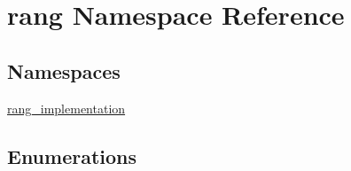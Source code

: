 \hypertarget{namespacerang}{}\section{rang Namespace Reference}
\label{namespacerang}
\subsection*{Namespaces}
\begin{DoxyCompactItemize}
\item 
 \mbox{\hyperlink{namespacerang_1_1rang__implementation}{rang\+\_\+implementation}}
\end{DoxyCompactItemize}
\subsection*{Enumerations}
